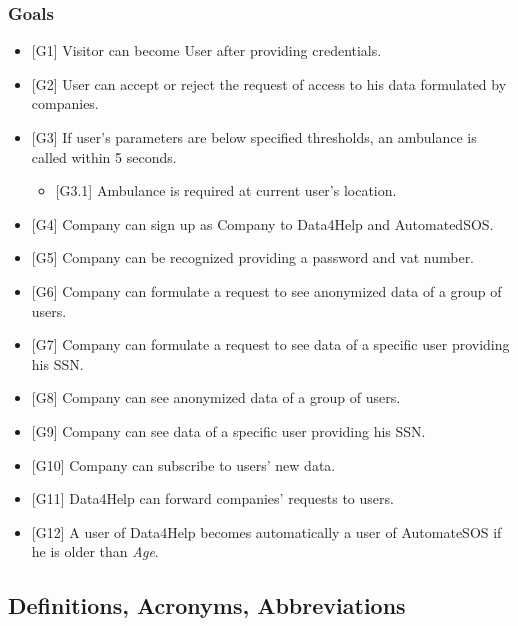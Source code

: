 \documentclass{article}
\begin{document}
\subsubsection{Goals}
\begin{itemize}
	\item {[G1]} Visitor can become User after providing credentials.
	\item {[G2]} User can accept or reject the request of access to his data formulated by companies.
	\item {[G3]} If user's parameters are below specified thresholds, an ambulance is called within 5 seconds. 
	\begin{itemize}
		\item {[G3.1]} Ambulance is required at current user's location. 
	\end{itemize}
	\item {[G4]} Company can sign up as Company to Data4Help and AutomatedSOS. 
	\item {[G5]} Company can be recognized providing a password and vat number.
	\item {[G6]} Company can formulate a request to see anonymized data of a group of users.
	\item {[G7]} Company can formulate a request to see data of a specific user providing his SSN.
	\item {[G8]} Company can see anonymized data of a group of users.
	\item {[G9]} Company can see data of a specific user providing his SSN.
	\item {[G10]} Company can subscribe to users' new data.
	\item {[G11]} Data4Help can forward companies' requests to users. 
	\item {[G12]} A user of Data4Help becomes automatically a user of AutomateSOS if he is older than \emph{Age}.
\end{itemize} 
\subsection{Definitions, Acronyms, Abbreviations}
\end{document}
